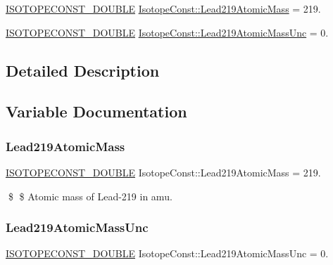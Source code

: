 \begin{DoxyCompactItemize}
\item 
\mbox{\hyperlink{group___isotope_const-_macros_ga8f45a7272ce02c0b4c65c44636ed719a}{I\+S\+O\+T\+O\+P\+E\+C\+O\+N\+S\+T\+\_\+\+D\+O\+U\+B\+LE}} \mbox{\hyperlink{group___isotope_const-_lead-_pb219_ga423203a2bf35560063e17c8f40fa762e}{Isotope\+Const\+::\+Lead219\+Atomic\+Mass}} = 219.
\item 
\mbox{\hyperlink{group___isotope_const-_macros_ga8f45a7272ce02c0b4c65c44636ed719a}{I\+S\+O\+T\+O\+P\+E\+C\+O\+N\+S\+T\+\_\+\+D\+O\+U\+B\+LE}} \mbox{\hyperlink{group___isotope_const-_lead-_pb219_ga22065e68c22aa5f6f6c5421b6e96cdbb}{Isotope\+Const\+::\+Lead219\+Atomic\+Mass\+Unc}} = 0.
\end{DoxyCompactItemize}


\subsection{Detailed Description}


\subsection{Variable Documentation}
\mbox{\label{group___isotope_const-_lead-_pb219_ga423203a2bf35560063e17c8f40fa762e}} 
\subsubsection{\texorpdfstring{Lead219\+Atomic\+Mass}{Lead219AtomicMass}}
{\footnotesize\ttfamily \mbox{\hyperlink{group___isotope_const-_macros_ga8f45a7272ce02c0b4c65c44636ed719a}{I\+S\+O\+T\+O\+P\+E\+C\+O\+N\+S\+T\+\_\+\+D\+O\+U\+B\+LE}} Isotope\+Const\+::\+Lead219\+Atomic\+Mass = 219.}

\$ \$ Atomic mass of Lead-\/219 in amu. \mbox{\label{group___isotope_const-_lead-_pb219_ga22065e68c22aa5f6f6c5421b6e96cdbb}} 
\subsubsection{\texorpdfstring{Lead219\+Atomic\+Mass\+Unc}{Lead219AtomicMassUnc}}
{\footnotesize\ttfamily \mbox{\hyperlink{group___isotope_const-_macros_ga8f45a7272ce02c0b4c65c44636ed719a}{I\+S\+O\+T\+O\+P\+E\+C\+O\+N\+S\+T\+\_\+\+D\+O\+U\+B\+LE}} Isotope\+Const\+::\+Lead219\+Atomic\+Mass\+Unc = 0.}

